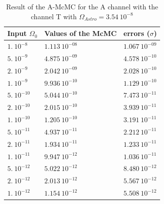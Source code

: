 \documentclass[a4paper,12pt]{article}
\begin{document}
\begin{table}[H]
\begin{center}
\begin{tabular}{|l|l|l|}
\hline
Input $\Omega_0$    & Values of the McMC     & errors ($\sigma$)    \\ \hline
$1. \ 10^{-8}$      & $1.113 \ 10^{-08}$     & $1.067 \ 10^{-09}$   \\ \hline
$5. \ 10^{-9}$      & $4.875 \ 10^{-09}$     & $4.578 \ 10^{-10}$  \\ \hline
$2. \ 10^{-9}$      & $2.042 \ 10^{-09}$     & $2.028 \ 10^{-10}$   \\ \hline
$1. \ 10^{-9}$      & $9.936 \ 10^{-10}$     & $1.129 \ 10^{-10}$   \\ \hline
$5. \ 10^{-10}$     & $5.044 \ 10^{-10}$     & $7.473 \ 10^{-11}$   \\ \hline
$2. \ 10^{-10}$     & $2.015 \ 10^{-10}$     & $3.939 \ 10^{-11}$   \\ \hline
$1. \ 10^{-10}$     & $1.205 \ 10^{-10}$     & $3.191 \ 10^{-11}$   \\ \hline
$5. \ 10^{-11}$     & $4.937 \ 10^{-11}$     & $2.212 \ 10^{-11}$   \\ \hline
$2. \ 10^{-11}$     & $1.934 \ 10^{-11}$     & $1.233 \ 10^{-11}$   \\ \hline
$1. \ 10^{-11}$     & $9.947 \ 10^{-12}$     & $1.036 \ 10^{-11}$   \\ \hline
$5. \ 10^{-12}$     & $5.022 \ 10^{-12}$     & $8.480 \ 10^{-12}$   \\ \hline
$2. \ 10^{-12}$     & $2.013 \ 10^{-12}$     & $5.567 \ 10^{-12}$   \\ \hline
$1. \ 10^{-12}$     & $1.154 \ 10^{-12}$     & $5.508 \ 10^{-12}$   \\ \hline
\end{tabular}
\end{center}
\caption{Result of the A-McMC for the A channel with the channel T with $\Omega_{Astro} = 3.54 \ 10^{-8}$}
\label{table:resultA+T-8}
\end{table}
\end{document}
